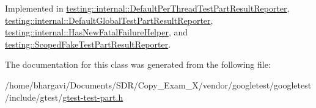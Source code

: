 Implemented in \hyperlink{classtesting_1_1internal_1_1_default_per_thread_test_part_result_reporter_ac6dc08eadc4e5a2a64a91d0b6c6b3aad}{testing\+::internal\+::\+Default\+Per\+Thread\+Test\+Part\+Result\+Reporter}, \hyperlink{classtesting_1_1internal_1_1_default_global_test_part_result_reporter_a6081576a23b964cfecab1e424d8044fc}{testing\+::internal\+::\+Default\+Global\+Test\+Part\+Result\+Reporter}, \hyperlink{classtesting_1_1internal_1_1_has_new_fatal_failure_helper_a2d2e1faa1f3669b82810df97ac678a27}{testing\+::internal\+::\+Has\+New\+Fatal\+Failure\+Helper}, and \hyperlink{classtesting_1_1_scoped_fake_test_part_result_reporter_a82531434f51632d98ed7cdcdb10b8b92}{testing\+::\+Scoped\+Fake\+Test\+Part\+Result\+Reporter}.



The documentation for this class was generated from the following file\+:\begin{DoxyCompactItemize}
\item 
/home/bhargavi/\+Documents/\+S\+D\+R/\+Copy\+\_\+\+Exam\+\_\+X/vendor/googletest/googletest/include/gtest/\hyperlink{gtest-test-part_8h}{gtest-\/test-\/part.\+h}\end{DoxyCompactItemize}
